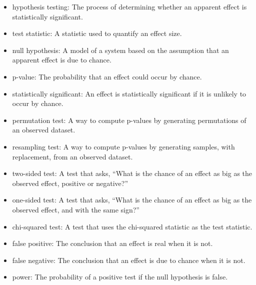 \documentclass[12pt]{book}
\begin{document}
\begin{itemize}

\item hypothesis testing: The process of determining whether an apparent
effect is statistically significant.

\item test statistic: A statistic used to quantify an effect size.

\item null hypothesis: A model of a system based on the assumption that
an apparent effect is due to chance.

\item p-value: The probability that an effect could occur by chance.

\item statistically significant: An effect is statistically
  significant if it is unlikely to occur by chance.
   

\item permutation test: A way to compute p-values by generating
  permutations of an observed dataset.

\item resampling test: A way to compute p-values by generating
  samples, with replacement, from an observed dataset.

\item two-sided test: A test that asks, ``What is the chance of an effect
as big as the observed effect, positive or negative?''

\item one-sided test: A test that asks, ``What is the chance of an effect
as big as the observed effect, and with the same sign?''

\item chi-squared test: A test that uses the chi-squared statistic as
the test statistic.

\item false positive: The conclusion that an effect is real when it is not.

\item false negative: The conclusion that an effect is due to chance when it
is not.

\item power: The probability of a positive test if the null hypothesis
is false.

\end{itemize}
\end{document}
